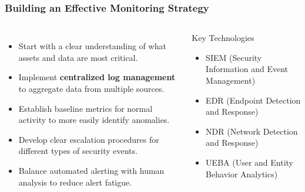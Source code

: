 \documentclass{beamer}
\begin{document}
\begin{frame}
    \frametitle{Building an Effective Monitoring Strategy}
    
    \begin{columns}[t]
    \begin{itemize}
    \item Start with a clear understanding of what assets and data are most critical.
    \item Implement \textbf{centralized log management} to aggregate data from multiple sources.
    \item Establish baseline metrics for normal activity to more easily identify anomalies.
    \item Develop clear escalation procedures for different types of security events.
    \item Balance automated alerting with human analysis to reduce alert fatigue.
    \end{itemize}
    
    \begin{exampleblock}{Key Technologies}
    \begin{itemize}
    \item SIEM (Security Information and Event Management)
    \item EDR (Endpoint Detection and Response)
    \item NDR (Network Detection and Response)
    \item UEBA (User and Entity Behavior Analytics)
    \end{itemize}
    \end{exampleblock}
    \end{columns}
    
    \end{frame}
    
\end{document}
